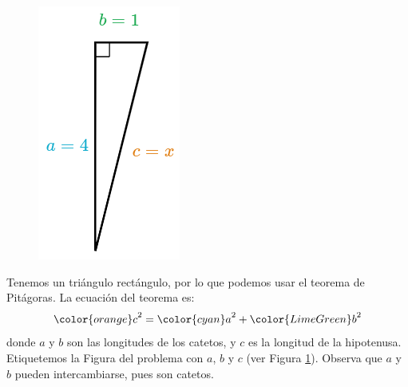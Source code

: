 \begin{minipage}[t][][t]{0.65\textwidth}
    \begin{solutionbox}{10cm}
        \begin{minipage}{0.4\textwidth}
            \begin{figure}[H]
                \centering
                \includegraphics[width=0.6\linewidth]{../images/lados_pitagoras_10a.png}
                \caption{}
                \label{fig:lados_pitagoras_10a}
            \end{figure}
        \end{minipage}\hfill
        \begin{minipage}{0.55\textwidth}
            Tenemos un triángulo rectángulo, por lo que podemos usar el teorema de Pitágoras.
            La ecuación del teorema es:
            \[{\color{orange}c}^2={\color{cyan}a}^2+{\color{LimeGreen}b}^2\]
            donde $a$ y $b$ son las longitudes de los catetos, y $c$ es la longitud de la hipotenusa.
            Etiquetemos la Figura del problema con $a$, $b$ y $c$ (ver Figura \ref{fig:lados_pitagoras_10a}).
            Observa que $a$ y $b$ pueden intercambiarse, pues son catetos.
        \end{minipage}
        \begin{align*}

\end{align*}
\end{solutionbox}
\end{minipage}
